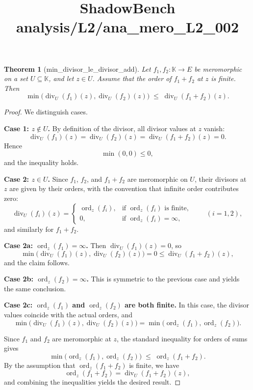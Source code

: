 \documentclass{article}
\title{ShadowBench analysis/L2/ana\_mero\_L2\_002}
\newtheorem{theorem}{Theorem}
\begin{document}
\maketitle

\begin{theorem}[min_divisor_le_divisor_add]
Let $f_1,f_2 : \mathbb K \to E$ be meromorphic on a set $U \subseteq \mathbb K$, and let $z \in U$. Assume that the order of $f_1+f_2$ at $z$ is finite.  Then
\[
\min\bigl(\operatorname{div}_U(f_1)(z),\operatorname{div}_U(f_2)(z)\bigr)
\;\le\;
\operatorname{div}_U(f_1+f_2)(z).
\]
\end{theorem}

\begin{proof}
We distinguish cases.

\medskip
\noindent\textbf{Case 1: $z \notin U$.}
By definition of the divisor, all divisor values at $z$ vanish:
\[
\operatorname{div}_U(f_1)(z)
=
\operatorname{div}_U(f_2)(z)
=
\operatorname{div}_U(f_1+f_2)(z)
=
0.
\]
Hence
\[
\min(0,0) \le 0,
\]
and the inequality holds.

\medskip
\noindent\textbf{Case 2: $z \in U$.}
Since $f_1$, $f_2$, and $f_1+f_2$ are meromorphic on $U$, their divisors at $z$ are given by their orders, with the convention that infinite order contributes zero:
\[
\operatorname{div}_U(f_i)(z)
=
\begin{cases}
\operatorname{ord}_z(f_i), & \text{if } \operatorname{ord}_z(f_i) \text{ is finite},\\
0, & \text{if } \operatorname{ord}_z(f_i)=\infty,
\end{cases}
\qquad (i=1,2),
\]
and similarly for $f_1+f_2$.

\medskip
\noindent\textbf{Case 2a: $\operatorname{ord}_z(f_1)=\infty$.}
Then $\operatorname{div}_U(f_1)(z)=0$, so
\[
\min\bigl(\operatorname{div}_U(f_1)(z),\operatorname{div}_U(f_2)(z)\bigr)=0
\le
\operatorname{div}_U(f_1+f_2)(z),
\]
and the claim follows.

\medskip
\noindent\textbf{Case 2b: $\operatorname{ord}_z(f_2)=\infty$.}
This is symmetric to the previous case and yields the same conclusion.

\medskip
\noindent\textbf{Case 2c: $\operatorname{ord}_z(f_1)$ and $\operatorname{ord}_z(f_2)$ are both finite.}
In this case, the divisor values coincide with the actual orders, and
\[
\min\bigl(\operatorname{div}_U(f_1)(z),\operatorname{div}_U(f_2)(z)\bigr)
=
\min\bigl(\operatorname{ord}_z(f_1),\operatorname{ord}_z(f_2)\bigr).
\]

Since $f_1$ and $f_2$ are meromorphic at $z$, the standard inequality for orders of sums gives
\[
\min\bigl(\operatorname{ord}_z(f_1),\operatorname{ord}_z(f_2)\bigr)
\;\le\;
\operatorname{ord}_z(f_1+f_2).
\]
By the assumption that $\operatorname{ord}_z(f_1+f_2)$ is finite, we have
\[
\operatorname{ord}_z(f_1+f_2)
=
\operatorname{div}_U(f_1+f_2)(z),
\]
and combining the inequalities yields the desired result.
\end{proof}
\end{document}
